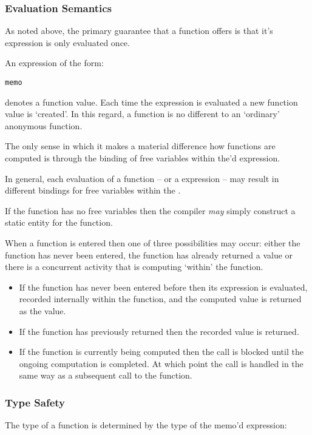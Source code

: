 \subsubsection{Evaluation Semantics}
As noted above, the primary guarantee that a  function offers is that it's expression is only evaluated once.

An expression of the form:
\begin{alltt}
memo 
\end{alltt}
denotes a function value. Each time the  expression is evaluated a new function value is `created'. In this regard, a  function is no different to an `ordinary' anonymous function.

\begin{aside}
The only sense in which it makes a material difference how  functions are computed is through the binding of free variables within the'd expression.

In general, each evaluation of a  function -- or a  expression -- may result in different bindings for free variables within the .

If the function has no free variables then the compiler \emph{may} simply construct a static entity for the function.
\end{aside}

When a  function is entered then one of three possibilities may occur: either the  function has never been entered, the  function has already returned a value or there is a concurrent activity that is computing `within' the function.

\begin{itemize}
\item If the  function has never been entered before then its expression is evaluated, recorded internally within the function, and the computed value is returned as the value.
\item If the  function has previously returned then the recorded value is returned.
\item If the  function is currently being computed then the call is blocked until the ongoing computation is completed. At which point the call is handled in the same way as a subsequent call to the  function.
\end{itemize}

\subsubsection{Type Safety}
The type of a  function is determined by the type of the memo'd expression:


